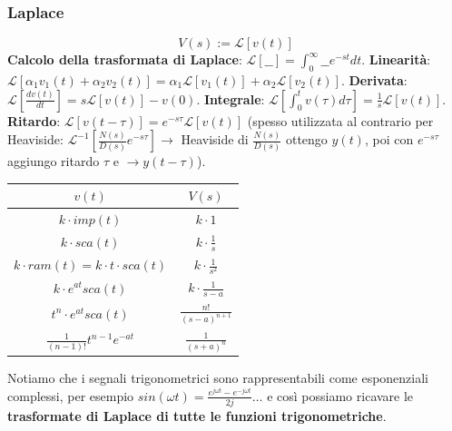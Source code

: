 \begin{landscape}
\begin{multicols*}{3}
    \subsubsection*{Laplace}
    \[
        V(s) := \mathcal{L}[v(t)]
    \]
    \textbf{Calcolo della trasformata di Laplace}: $\mathcal{L}[\_\_] =  \int_{0}^{\infty}\_\_ e^{-st} dt$.\newline
    \textbf{Linearità}: $\mathcal{L}[\alpha_1 v_1(t) + \alpha_2 v_2(t)] = \alpha_1 \mathcal{L}[v_1(t)] + \alpha_2 \mathcal{L}[v_2(t)]$.\newline
    \textbf{Derivata}: $\mathcal{L}\left[ \frac{d v(t)}{dt} \right] = s \mathcal{L}[v(t)] - v(0)$.\newline
    \textbf{Integrale}: $\mathcal{L}\left[ \int_{0}^{t} v(\tau) d \tau \right] = \frac{1}{s} \mathcal{L}[v(t)]$.\newline
    \textbf{Ritardo}: $ \mathcal{L}[ v(t - \tau)] = e^{-s \tau} \mathcal{L}[v(t)]$ (spesso utilizzata al contrario per Heaviside: $\mathcal{L}^{-1}\left[\frac{N(s)}{D(s)}e^{-s \tau}\right] \rightarrow $ Heaviside di $\frac{N(s)}{D(s)}$ ottengo $y(t)$, poi con $e^{-s \tau}$ aggiungo ritardo $\tau$ e $\rightarrow  y(t- \tau)$).\newline
    \renewcommand{\arraystretch}{2}
    \begin{center}
        \begin{tabular}{ |c|c| } 
        \hline
        \;\;\;\;\;\;\;\;\;\;\;\;\;\;\;$v(t)$ \;\;\;\;\;\;\;\;\;\;\;\;\;\;\;& \;\;\;\;\;\;\;\;\;\;\;\;\;\;\;$V(s)$ \;\;\;\;\;\;\;\;\;\;\;\;\;\;\;\\ 
        \hline
        $k \cdot imp(t)$ & $k \cdot 1$ \\ 
        $k \cdot sca(t)$ & $k \cdot \frac{1}{s}$  \\ 
        $k \cdot ram(t) =k \cdot t \cdot  sca(t)$ & $k \cdot \frac{1}{s^2}$ \\
        $k \cdot e^{at}sca(t)$ & $k \cdot \frac{1}{s-a}$ \\ 
        $t^{n}\cdot e^{at}sca(t)$ & $\frac{n!}{(s-a)^{n+1}}$\\ 
        $\frac{1}{(n-1)!} t^{n-1}e^{-at}$ & $\frac{1}{(s+a)^n}$\\
        \hline
        \end{tabular}
    \end{center}
    \renewcommand{\arraystretch}{1}
    Notiamo che i segnali trigonometrici sono rappresentabili come esponenziali complessi, per esempio $sin(\omega t) = \frac{e^{j \omega t}- e^{-j \omega t}}{2j} \dots$ e così possiamo ricavare le \textbf{trasformate di Laplace di tutte le funzioni trigonometriche}.\newline

\end{multicols*}
\end{landscape}
